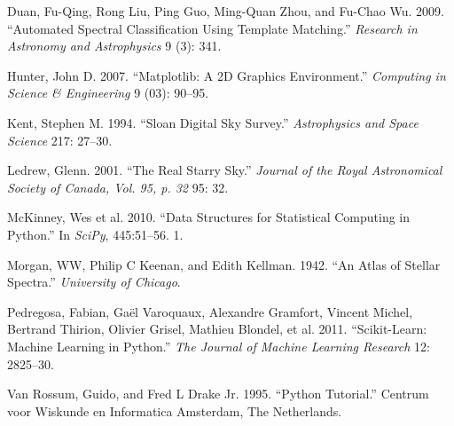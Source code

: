 \documentclass[
  letterpaper,
  DIV=11,
  numbers=noendperiod]{scrartcl}
\newlength{\cslhangindent}
\newenvironment{CSLReferences}[2] %
 {\begin{list}{}{%
  \setlength{\itemindent}{0pt}
  \setlength{\leftmargin}{0pt}
  \setlength{\parsep}{0pt}
  \ifodd #1
   \setlength{\leftmargin}{\cslhangindent}
   \setlength{\itemindent}{-1\cslhangindent}
  \fi
  \setlength{\itemsep}{#2\baselineskip}}}
 {\end{list}}
\begin{document}
\label{refs}
\begin{CSLReferences}{1}{0}
Duan, Fu-Qing, Rong Liu, Ping Guo, Ming-Quan Zhou, and Fu-Chao Wu. 2009.
{``Automated Spectral Classification Using Template Matching.''}
\emph{Research in Astronomy and Astrophysics} 9 (3): 341.

Hunter, John D. 2007. {``Matplotlib: A 2D Graphics Environment.''}
\emph{Computing in Science \& Engineering} 9 (03): 90--95.

Kent, Stephen M. 1994. {``Sloan Digital Sky Survey.''}
\emph{Astrophysics and Space Science} 217: 27--30.

Ledrew, Glenn. 2001. {``The Real Starry Sky.''} \emph{Journal of the
Royal Astronomical Society of Canada, Vol. 95, p. 32} 95: 32.

McKinney, Wes et al. 2010. {``Data Structures for Statistical Computing
in Python.''} In \emph{SciPy}, 445:51--56. 1.

Morgan, WW, Philip C Keenan, and Edith Kellman. 1942. {``An Atlas of
Stellar Spectra.''} \emph{University of Chicago}.

Pedregosa, Fabian, Gaël Varoquaux, Alexandre Gramfort, Vincent Michel,
Bertrand Thirion, Olivier Grisel, Mathieu Blondel, et al. 2011.
{``Scikit-Learn: Machine Learning in Python.''} \emph{The Journal of
Machine Learning Research} 12: 2825--30.

Van Rossum, Guido, and Fred L Drake Jr. 1995. {``Python Tutorial.''}
Centrum voor Wiskunde en Informatica Amsterdam, The Netherlands.

\end{CSLReferences}
\end{document}
